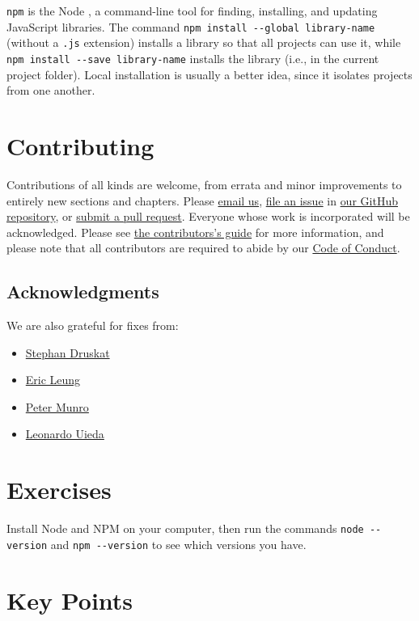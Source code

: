 \texttt{npm} is the Node ,
a command-line tool for finding, installing, and updating JavaScript libraries.
The command \texttt{npm\ install\ -\/-global\ library-name} (without a \texttt{.js} extension)
installs a library  so that all projects can use it,
while \texttt{npm\ install\ -\/-save\ library-name} installs the library 
(i.e., in the current project folder).
Local installation is usually a better idea,
since it isolates projects from one another.

\section{Contributing}\label{s:index-contrib}

Contributions of all kinds are welcome,
from errata and minor improvements to entirely new sections and chapters.
Please \href{mailto:gvwilson@third-bit.com}{email us},
\href{https://github.com/software-tools-in-javascript/js4ds/issues}{file an issue} in \href{https://github.com/software-tools-in-javascript/js4ds/}{our GitHub repository},
or \href{https://github.com/software-tools-in-javascript/js4ds/pulls}{submit a pull request}.
Everyone whose work is incorporated will be acknowledged.
Please see \href{/en/contributing/}{the contributors's guide} for more information,
and please note that all contributors are required to abide by
our \href{/en/conduct/}{Code of Conduct}.

\subsection{Acknowledgments}\label{s:intro-acknowledgments}

We are also grateful for fixes from:

\begin{itemize}
\item
  \href{https://github.com/sdruskat}{Stephan Druskat}
\item
  \href{https://erictleung.com/}{Eric Leung}
\item
  \href{https://github.com/pdm55}{Peter Munro}
\item
  \href{http://www.leouieda.com/}{Leonardo Uieda}
\end{itemize}

\section{Exercises}\label{s:intro-exercises}


Install Node and NPM on your computer,
then run the commands \texttt{node\ -\/-version} and \texttt{npm\ -\/-version}
to see which versions you have.

\section*{Key Points}


